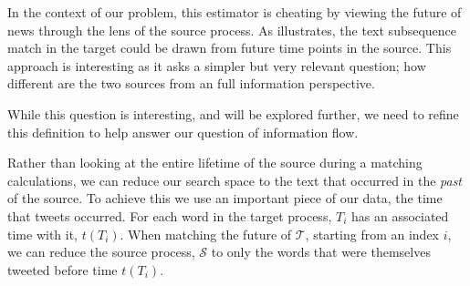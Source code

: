 In the context of our problem, this estimator is cheating by viewing the future of news through the lens of the source process. As  illustrates, the text subsequence match in the target could be drawn from future time points in the source. This approach is interesting as it asks a simpler but very relevant question; how different are the two sources from an full information perspective.


\begin{figure}
\end{figure}


While this question is interesting, and will be explored further, we need to refine this definition to help answer our question of information flow.

Rather than looking at the entire lifetime of the source during a matching calculations, we can reduce our search space to the text that occurred in the \emph{past} of the source. To achieve this we use an important piece of our data, the time that tweets occurred. For each word in the target process, $T_i$ has an associated time with it, $t(T_i)$. When matching the future of $\mathcal{T}$, starting from an index $i$, we can reduce the source process, $\mathcal{S}$ to only the words that were themselves tweeted before time $t(T_i)$. 

